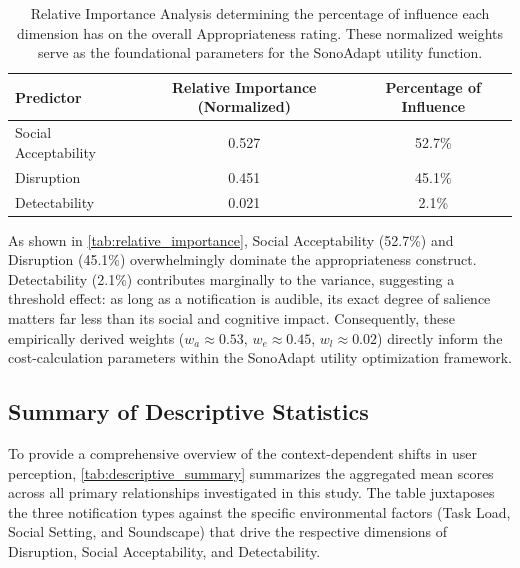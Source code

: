 \begin{table}[H]
\centering
\caption{Relative Importance Analysis determining the percentage of influence each dimension has on the overall Appropriateness rating. These normalized weights serve as the foundational parameters for the SonoAdapt utility function.}
\label{tab:relative_importance}
\begin{tabular}{@{}lcc@{}}
\toprule
\textbf{Predictor} & \textbf{Relative Importance (Normalized)} & \textbf{Percentage of Influence} \\
\midrule
Social Acceptability & 0.527 & 52.7\% \\
Disruption & 0.451 & 45.1\% \\
Detectability & 0.021 & 2.1\% \\
\bottomrule
\end{tabular}
\end{table}

As shown in \autoref{tab:relative_importance}, Social Acceptability (52.7\%) and Disruption (45.1\%) overwhelmingly dominate the appropriateness construct. Detectability (2.1\%) contributes marginally to the variance, suggesting a threshold effect: as long as a notification is audible, its exact degree of salience matters far less than its social and cognitive impact. Consequently, these empirically derived weights ($w_a \approx 0.53$, $w_e \approx 0.45$, $w_l \approx 0.02$) directly inform the cost-calculation parameters within the SonoAdapt utility optimization framework.







\subsection{Summary of Descriptive Statistics}
\label{sec:res_summary_table}
To provide a comprehensive overview of the context-dependent shifts in user perception, \autoref{tab:descriptive_summary} summarizes the aggregated mean scores across all primary relationships investigated in this study. The table juxtaposes the three notification types against the specific environmental factors (Task Load, Social Setting, and Soundscape) that drive the respective dimensions of Disruption, Social Acceptability, and Detectability.

